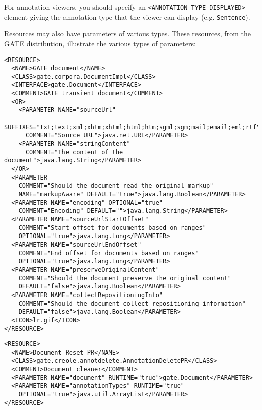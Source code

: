 For annotation viewers, you should specify an
\verb|<ANNOTATION_TYPE_DISPLAYED>| element giving the annotation type that the
viewer can display (e.g. {\tt Sentence}).


Resources may also have parameters of various types.
These resources, from the GATE distribution, illustrate the various types of
parameters:
\begin{small}\begin{verbatim}
<RESOURCE>
  <NAME>GATE document</NAME>
  <CLASS>gate.corpora.DocumentImpl</CLASS>
  <INTERFACE>gate.Document</INTERFACE>
  <COMMENT>GATE transient document</COMMENT>
  <OR>
    <PARAMETER NAME="sourceUrl"
      SUFFIXES="txt;text;xml;xhtm;xhtml;html;htm;sgml;sgm;mail;email;eml;rtf"
      COMMENT="Source URL">java.net.URL</PARAMETER>
    <PARAMETER NAME="stringContent"
      COMMENT="The content of the document">java.lang.String</PARAMETER>
  </OR>
  <PARAMETER
    COMMENT="Should the document read the original markup"
    NAME="markupAware" DEFAULT="true">java.lang.Boolean</PARAMETER>
  <PARAMETER NAME="encoding" OPTIONAL="true"
    COMMENT="Encoding" DEFAULT="">java.lang.String</PARAMETER>
  <PARAMETER NAME="sourceUrlStartOffset"
    COMMENT="Start offset for documents based on ranges"
    OPTIONAL="true">java.lang.Long</PARAMETER>
  <PARAMETER NAME="sourceUrlEndOffset"
    COMMENT="End offset for documents based on ranges"
    OPTIONAL="true">java.lang.Long</PARAMETER>
  <PARAMETER NAME="preserveOriginalContent"
    COMMENT="Should the document preserve the original content"
    DEFAULT="false">java.lang.Boolean</PARAMETER>
  <PARAMETER NAME="collectRepositioningInfo"
    COMMENT="Should the document collect repositioning information"
    DEFAULT="false">java.lang.Boolean</PARAMETER>
  <ICON>lr.gif</ICON>
</RESOURCE>
\end{verbatim}\end{small}

\begin{small}\begin{verbatim}
<RESOURCE>
  <NAME>Document Reset PR</NAME>
  <CLASS>gate.creole.annotdelete.AnnotationDeletePR</CLASS>
  <COMMENT>Document cleaner</COMMENT>
  <PARAMETER NAME="document" RUNTIME="true">gate.Document</PARAMETER>
  <PARAMETER NAME="annotationTypes" RUNTIME="true"
    OPTIONAL="true">java.util.ArrayList</PARAMETER>
</RESOURCE>
\end{verbatim}\end{small}

